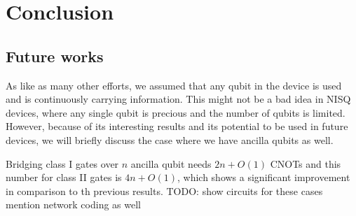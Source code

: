 
\chapter{Conclusion}\label{chap:conclusion}

\section{Future works}

As like as many other efforts, we assumed that any qubit in the device is used and is continuously carrying information. This might not be a bad idea in NISQ devices, where any single qubit is precious and the number of qubits is limited. However, because of its interesting results and its potential to be used in future devices, we will briefly discuss the case where we have ancilla qubits as well.

Bridging class I gates over $n$ ancilla qubit needs $2n + O(1)$ CNOTs and this number for class II gates is $4n + O(1)$, which shows a significant improvement in comparison to th previous results.
{ \color{red} TODO: show circuits for these cases 
  mention network coding as well \cite{ho2008}
}
